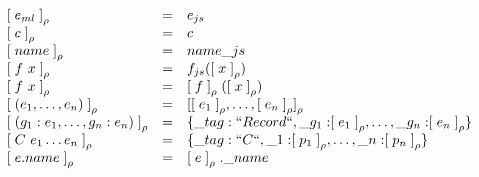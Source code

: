\documentclass[12pt]{matmex-diploma}
\newcommand \lpar  {\mathrel{{[}}}
\newcommand \rpar  {\mathrel{{]}}}
\begin{document}
\begin{center}
$
\begin{array}{lll}
\lpar e_{ml} \rpar _{\rho} &=& e_{js} \\
\lpar c \rpar _{\rho} &=& c \\
\lpar name \rpar _{\rho} &=& name\_js \\
\lpar f~x \rpar _{\rho} &=&  f_{js}(\lpar x \rpar _{\rho}) \\
\lpar f~x \rpar _{\rho} &=& \lpar f \rpar _{\rho} (\lpar x \rpar _{\rho}) \\
\lpar (e_1, \ldots, e_n) \rpar _{\rho} &=& \lpar \lpar e_1 \rpar _{\rho}, \ldots, \lpar e_n \rpar _{\rho} \rpar _{\rho} \\
\lpar (g_1:e_1, \ldots, g_n:e_n) \rpar _{\rho} &=& \{ \_tag: ``Record``, \_g_1: \lpar e_1 \rpar _{\rho}, \ldots, \_g_n: \lpar e_n \rpar _{\rho} \} \\
\lpar C~e_1 \ldots e_n  \rpar _{\rho} &=& \{ \_tag: ``C``, \_1: \lpar p_1 \rpar _{\rho}, \ldots, \_n: \lpar p_n \rpar _{\rho} \} \\
\lpar e.name \rpar _{\rho} &=& \lpar e \rpar _{\rho}.\_name 
\end{array}
$
\captionsetup{type=lstlisting}
\label{tbl:tr_expr}
\end{center}
\end{document}
